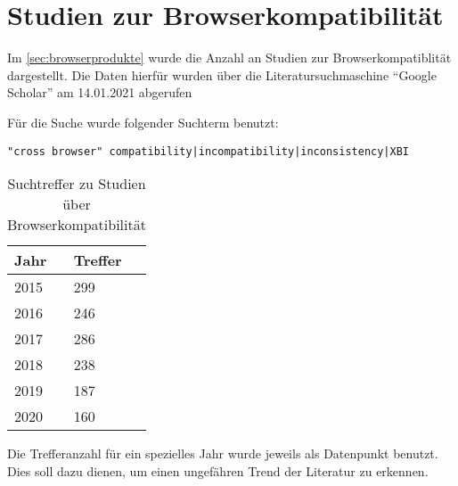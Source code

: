 \section{Studien zur Browserkompatibilität}
\label{sec:studien-zur-browser-kompatibilitaet}

Im \autoref{sec:browserprodukte} wurde die Anzahl an Studien zur Browserkompatiblität dargestellt. Die Daten hierfür wurden über die Literatursuchmaschine \enquote{Google Scholar} am 14.01.2021 abgerufen

Für die Suche wurde folgender Suchterm benutzt:
\begin{verbatim}
"cross browser" compatibility|incompatibility|inconsistency|XBI
\end{verbatim}

\begin{wraptable}[12]{r}{0.4\linewidth}
\centering
\begin{tabular}{|l|l|}
  \hline
  Jahr & Treffer \\
  \hline
  2015 & 299 \\
  \hline
  2016 & 246 \\
  \hline
  2017 & 286 \\
  \hline
  2018 & 238 \\
  \hline
  2019 & 187 \\
  \hline
  2020 & 160 \\
  \hline
\end{tabular}
\caption{Suchtreffer zu Studien über Browserkompatibilität}
\end{wraptable}

\def\lc{\left\lceil}   
\def\rc{\right\rceil}

Die Trefferanzahl für ein spezielles Jahr wurde jeweils als Datenpunkt benutzt. Dies soll dazu dienen, um einen ungefähren Trend der Literatur zu erkennen.